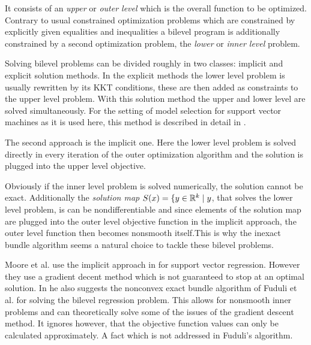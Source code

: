It consists of an \emph{upper} or \emph{outer level} which is the overall function to be optimized. Contrary to usual constrained optimization problems which are constrained by explicitly given equalities and inequalities a  bilevel program is additionally constrained by a second optimization problem, the \emph{lower} or \emph{inner level} problem.

Solving bilevel problems can be divided roughly in two classes: implicit and explicit solution methods. 
In the explicit methods the lower level problem is usually rewritten by its KKT conditions, these are then added as constraints to the upper level problem. With this solution method the upper and lower level are solved simultaneously. For the setting of model selection for support vector machines as it is used here, this method is described in detail in \cite{Kunapuli2008}.

The second approach is the implicit one. Here the lower level problem is solved directly in every iteration of the outer optimization algorithm and the solution is plugged into the upper level objective. 

Obviously if the inner level problem is solved numerically, the solution cannot be exact. Additionally the \emph{solution map} \( S(x) = \{y \in \mathbb{R}^k \mid y\), that solves the lower level problem, is can be nondifferentiable \cite{Outrata1998} and since elements of  the solution map are plugged into the outer level objective function in the implicit approach, the outer level function then becomes nonsmooth itself.This is why the inexact bundle algorithm seems a natural choice to tackle these bilevel problems. 

Moore et al. use the implicit approach in \cite{Moore2011} for support vector regression. However they use a gradient decent method which is not guaranteed to stop at an optimal solution.
In \cite{Moore2010a} he also suggests the nonconvex exact bundle algorithm of Fuduli et al. \cite{Fuduli2004a} for solving the bilevel regression problem. This allows for nonsmooth inner problems and can theoretically solve some of the issues of the gradient descent method. It ignores however, that the objective function values can only be calculated approximately. A fact which is not addressed in Fuduli's algorithm.


